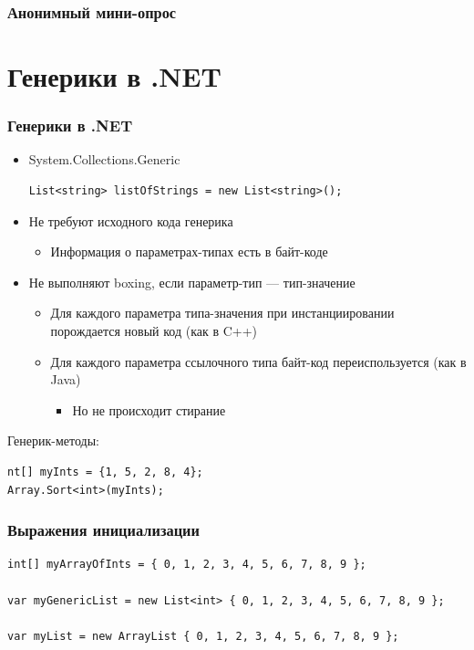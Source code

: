 \documentclass[xetex,mathserif,serif]{beamer}
\begin{document}
    \begin{frame}
        \frametitle{Анонимный мини-опрос}
    \end{frame}

    \section{Генерики в .NET}

    \begin{frame}[fragile]
        \frametitle{Генерики в .NET}
        \begin{itemize}
            \item System.Collections.Generic
            \begin{verbatim}
List<string> listOfStrings = new List<string>();
            \end{verbatim}
            \item Не требуют исходного кода генерика
            \begin{itemize}
                \item Информация о параметрах-типах есть в байт-коде
            \end{itemize}
            \item Не выполняют boxing, если параметр-тип --- тип-значение
            \begin{itemize}
                \item Для каждого параметра типа-значения при инстанциировании порождается новый код (как в C++)
                \item Для каждого параметра ссылочного типа байт-код переиспользуется (как в Java)
                \begin{itemize}
                    \item Но не происходит стирание
                \end{itemize}
            \end{itemize}
        \end{itemize}

        Генерик-методы:
        \begin{verbatim}
nt[] myInts = {1, 5, 2, 8, 4};
Array.Sort<int>(myInts);
        \end{verbatim}
    \end{frame}

    \begin{frame}[fragile]
        \frametitle{Выражения инициализации}
        \begin{verbatim}
int[] myArrayOfInts = { 0, 1, 2, 3, 4, 5, 6, 7, 8, 9 };

var myGenericList = new List<int> { 0, 1, 2, 3, 4, 5, 6, 7, 8, 9 };

var myList = new ArrayList { 0, 1, 2, 3, 4, 5, 6, 7, 8, 9 };
        \end{verbatim}
    \end{frame}
\end{document}

